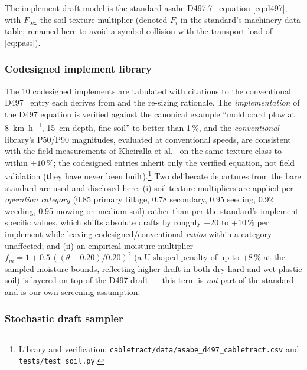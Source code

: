 \documentclass[11pt,a4paper]{article}
\begin{document}
The implement-draft model is the standard \gls{asabe} D497.7~\cite{asabe-d497} equation \cref{eq:d497}, with $F_{\!\text{tex}}$ the soil-texture multiplier (denoted $F_i$ in the standard's machinery-data table; renamed here to avoid a symbol collision with the transport load of \cref{eq:pass}).

\subsubsection{Codesigned implement library}\label{sec:soil-codesigned}

The 10 codesigned implements are tabulated with citations to the conventional D497~\cite{asabe-d497} entry each derives from and the re-sizing rationale. The \emph{implementation} of the D497 equation is verified against the canonical example ``moldboard plow at \SI{8}{\kilo\meter\per\hour}, \SI{15}{\centi\meter} depth, fine soil'' to better than 1\,\%, and the \emph{conventional} library's P50/P90 magnitudes, evaluated at conventional speeds, are consistent with the field measurements of Kheiralla et al.~\cite{kheiralla2004tillage} on the same texture class to within $\pm 10\,\%$; the codesigned entries inherit only the verified equation, not field validation (they have never been built).\footnote{Library and verification: \texttt{cabletract/data/asabe\_d497\_cabletract.csv} and \texttt{tests/test\_soil.py}.} Two deliberate departures from the bare standard are used and disclosed here: (i) soil-texture multipliers are applied per \emph{operation category} (0.85 primary tillage, 0.78 secondary, 0.95 seeding, 0.92 weeding, 0.95 mowing on medium soil) rather than per the standard's implement-specific values, which shifts absolute drafts by roughly $-20$ to $+10\,\%$ per implement while leaving codesigned/conventional \emph{ratios} within a category unaffected; and (ii) an empirical moisture multiplier $f_m = 1 + 0.5\,((\theta - 0.20)/0.20)^2$ (a U-shaped penalty of up to $+8\,\%$ at the sampled moisture bounds, reflecting higher draft in both dry-hard and wet-plastic soil) is layered on top of the D497 draft --- this term is \emph{not} part of the standard and is our own screening assumption.

\subsubsection{Stochastic draft sampler}\label{sec:soil-monte-carlo}
\end{document}
